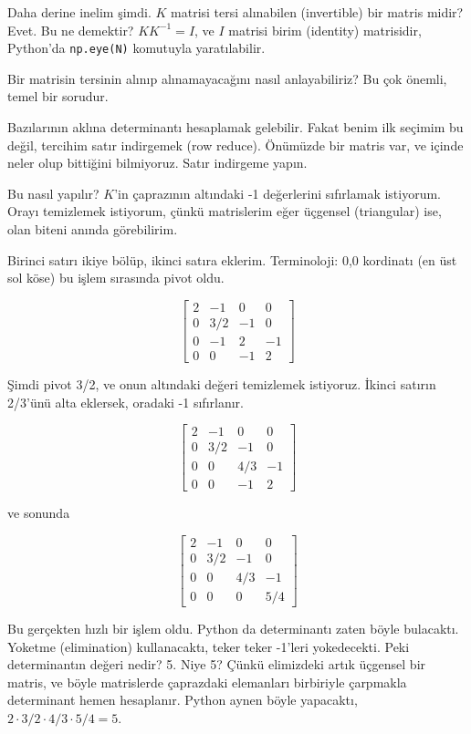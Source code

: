 \documentclass[12pt,fleqn]{article}\usepackage{../../common}
\begin{document}
Daha derine inelim şimdi. $K$ matrisi tersi alınabilen (invertible) bir
matris midir? Evet. Bu ne demektir? $KK^{-1} = I$, ve $I$ matrisi birim
(identity) matrisidir, Python'da \verb!np.eye(N)! komutuyla 
yaratılabilir. 

Bir matrisin tersinin alınıp alınamayacağını nasıl anlayabiliriz? Bu çok önemli,
temel bir sorudur.

Bazılarının aklına determinantı hesaplamak gelebilir. Fakat benim ilk
seçimim bu değil, tercihim satır indirgemek (row reduce). Önümüzde bir
matris var, ve içinde neler olup bittiğini bilmiyoruz. Satır indirgeme
yapın.

Bu nasıl yapılır? $K$'in çaprazının altındaki -1 değerlerini sıfırlamak
istiyorum. Orayı temizlemek istiyorum, çünkü matrislerim eğer üçgensel
(triangular) ise, olan biteni anında görebilirim.

Birinci satırı ikiye bölüp, ikinci satıra eklerim. Terminoloji: 0,0 kordinatı
(en üst sol köse) bu işlem sırasında pivot oldu.

$$ 
\left[\begin{array}{rrrr}
2 & -1  &  0 & 0 \\
0 &  3/2 & -1 &  0 \\
0 & -1 & 2 & -1 \\
0 &  0 & -1 & 2 
\end{array}\right]
$$

Şimdi pivot 3/2, ve onun altındaki değeri temizlemek istiyoruz. İkinci
satırın 2/3'ünü alta eklersek, oradaki -1 sıfırlanır.

$$ 
\left[\begin{array}{rrrr}
2 & -1 & 0 & 0 \\
0 & 3/2 & -1 & 0 \\
0 & 0 & 4/3 & -1 \\
0 & 0 & -1 & 2
\end{array}\right]
$$

ve sonunda

$$ 
\left[\begin{array}{rrrr}
2 & -1 & 0 & 0 \\
0 & 3/2 & -1 & 0 \\
0 & 0 & 4/3 & -1 \\
0 & 0 &  0 & 5/4
\end{array}\right]
$$

Bu gerçekten hızlı bir işlem oldu. Python da determinantı zaten böyle
bulacaktı. Yoketme (elimination) kullanacaktı, teker teker -1'leri
yokedecekti. Peki determinantın değeri nedir? 5. Niye 5? Çünkü elimizdeki
artık üçgensel bir matris, ve böyle matrislerde çaprazdaki elemanları
birbiriyle çarpmakla determinant hemen hesaplanır. Python aynen böyle
yapacaktı, $2 \cdot 3/2 \cdot 4/3 \cdot 5/4 = 5$.
\end{document}
